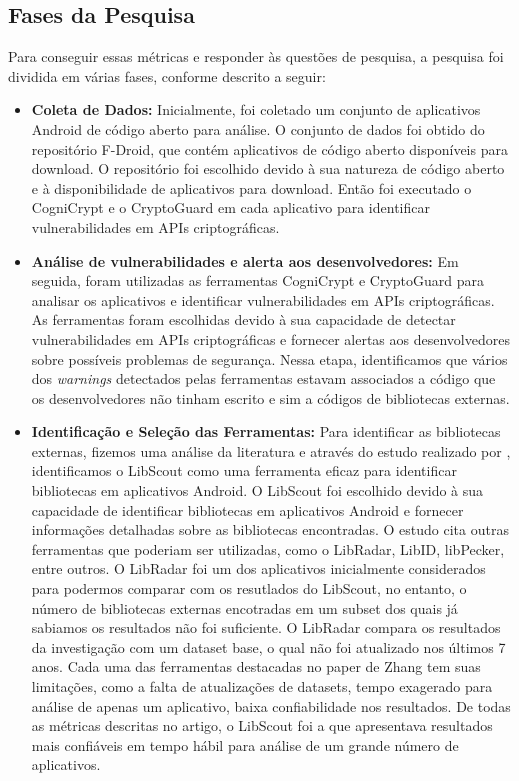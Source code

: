 \subsection{Fases da Pesquisa}

Para conseguir essas métricas e responder às questões de pesquisa, a pesquisa foi dividida em várias fases, conforme descrito a seguir:

\begin{itemize}
\item \textbf{Coleta de Dados:} Inicialmente, foi coletado um conjunto de aplicativos Android de código aberto para análise. O conjunto de dados foi obtido do repositório F-Droid, que contém aplicativos de código aberto disponíveis para download. O repositório foi escolhido devido à sua natureza de código aberto e à disponibilidade de aplicativos para download. Então foi executado o CogniCrypt e o CryptoGuard em cada aplicativo para identificar vulnerabilidades em APIs criptográficas.

\item \textbf{Análise de vulnerabilidades e alerta aos desenvolvedores:} Em seguida, foram utilizadas as ferramentas CogniCrypt e CryptoGuard para analisar os aplicativos e identificar vulnerabilidades em APIs criptográficas. As ferramentas foram escolhidas devido à sua capacidade de detectar vulnerabilidades em APIs criptográficas e fornecer alertas aos desenvolvedores sobre possíveis problemas de segurança. Nessa etapa, identificamos que vários dos \textit{warnings} detectados pelas ferramentas estavam associados a código que os desenvolvedores não tinham escrito e sim a códigos de bibliotecas externas. 

\item \textbf{Identificação e Seleção das Ferramentas:} Para identificar as bibliotecas externas, fizemos uma análise da literatura e através do estudo realizado por \cite{api_tpl_zhang}, identificamos o LibScout como uma ferramenta eficaz para identificar bibliotecas em aplicativos Android. O LibScout foi escolhido devido à sua capacidade de identificar bibliotecas em aplicativos Android e fornecer informações detalhadas sobre as bibliotecas encontradas. O estudo cita outras ferramentas que poderiam ser utilizadas, como o LibRadar, LibID, libPecker, entre outros. O LibRadar foi um dos aplicativos inicialmente considerados para podermos comparar com os resutlados do LibScout, no entanto, o número de bibliotecas externas encotradas em um subset dos quais já sabiamos os resultados não foi suficiente. O LibRadar compara os resultados da investigação com um dataset base, o qual não foi atualizado nos últimos 7 anos. Cada uma das ferramentas destacadas no paper de Zhang tem suas limitações, como a falta de atualizações de datasets, tempo exagerado para análise de apenas um aplicativo, baixa confiabilidade nos resultados. De todas as métricas descritas no artigo, o LibScout foi a que apresentava resultados mais confiáveis em tempo hábil para análise de um grande número de aplicativos. 


\end{itemize}
